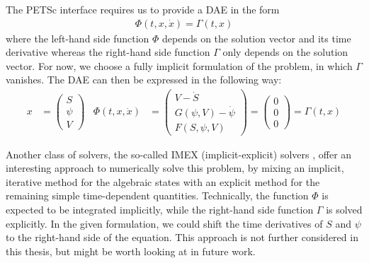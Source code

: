 The PETSc interface requires us to provide a DAE in the form
\begin{align}
	\Phi(t, x,\dot{x}) = \Gamma(t,x) 
\end{align}
where the left-hand side function $\Phi$ depends on the solution vector and its time derivative whereas the right-hand side function $\Gamma$ only depends on the solution vector. For now, we choose a fully implicit formulation of the problem, in which $\Gamma$ vanishes. The DAE can then be expressed in the following way: 
\begin{align}
\label{eq:DAE_extended_formulation_SEAS}
	x &= \begin{pmatrix}
		S \\ \psi \\ V
	\end{pmatrix} & \Phi(t, x,\dot{x}) &= \begin{pmatrix}
	 	V - \dot{S} \\ G(\psi, V) - \dot{\psi}  \\ F(S,\psi,V)
	\end{pmatrix} = \begin{pmatrix}
		0 \\ 0 \\ 0
	\end{pmatrix} = \Gamma(t,x)
\end{align}

Another class of solvers, the so-called IMEX (implicit-explicit) solvers \cite{IMEX}, offer an interesting approach to numerically solve this problem, by mixing an implicit, iterative method for the algebraic states with an explicit method for the remaining simple time-dependent quantities. Technically, the function $\Phi$ is expected to be integrated implicitly, while the right-hand side function $\Gamma$ is solved explicitly. In the given formulation, we could shift the time derivatives of $S$ and $\psi$ to the right-hand side of the equation. This approach is not further considered in this thesis, but might be worth looking at in future work.

